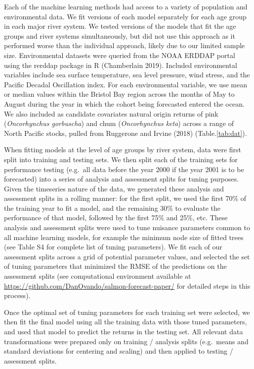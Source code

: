 \documentclass[
]{article}
\begin{document}
Each of the machine learning methods had access to a variety of population and environmental data. We fit versions of each model separately for each age group in each major river system. We tested versions of the models that fit the age groups and river systems simultaneously, but did not use this approach as it performed worse than the individual approach, likely due to our limited sample size. Environmental datasets were queried from the NOAA ERDDAP portal using the rerddap package in R (Chamberlain 2019). Included environmental variables include sea surface temperature, sea level pressure, wind stress, and the Pacific Decadal Oscillation index. For each environmental variable, we use mean or median values within the Bristol Bay region across the months of May to August during the year in which the cohort being forecasted entered the ocean. We also included as candidate covariates natural origin returns of pink (\emph{Oncorhynchus gorbuscha}) and chum (\emph{Oncorhynchus keta}) across a range of North Pacific stocks, pulled from Ruggerone and Irvine (2018) (Table.\ref{tab:dat}).

When fitting models at the level of age groups by river system, data were first split into training and testing sets. We then split each of the training sets for performance testing (e.g.~all data before the year 2000 if the year 2001 is to be forecasted) into a series of analysis and assessment splits for tuning purposes. Given the timeseries nature of the data, we generated these analysis and assessment splits in a rolling manner: for the first split, we used the first 70\% of the training year to fit a model, and the remaining 30\% to evaluate the performance of that model, followed by the first 75\% and 25\%, etc. These analysis and assessment splits were used to tune nuisance parameters common to all machine learning models, for example the minimum node size of fitted trees (see Table S4 for complete list of tuning parameters). We fit each of our assessment splits across a grid of potential parameter values, and selected the set of tuning parameters that minimized the RMSE of the predictions on the assessment splits (see computational environment available at \url{https://github.com/DanOvando/salmon-forecast-paper/} for detailed steps in this process).

Once the optimal set of tuning parameters for each training set were selected, we then fit the final model using all the training data with those tuned parameters, and used that model to predict the returns in the testing set. All relevant data transformations were prepared only on training / analysis splits (e.g.~means and standard deviations for centering and scaling) and then applied to testing / assessment splits.
\end{document}
